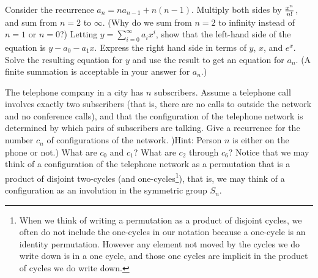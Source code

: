 \bp 
\itemm  Consider the recurrence
$a_n=na_{n-1} +n(n-1)$.  Multiply both sides by $x^n\over n!$, and sum
from $n=2$ to $\infty$.  (Why do we sum from $n=2$ to infinity instead 
of $n=1$ or $n=0$?)  Letting
$y =
\sum_{i=0}^\infty a_ix^i$, show that the left-hand side of the equation
is $y-a_0 -a_1x$.  Express the right hand side in terms of $y$, $x$, and
$e^x$.  Solve the resulting equation for $y$ and use the result to get an
equation for
$a_n$.  (A finite summation is acceptable in your answer for $a_n$.)

\itemesi The telephone company in a city has $n$ subscribers.  Assume a
telephone call involves exactly two subscribers (that is, there are no
calls to outside the network and no conference calls), and that the
configuration of the telephone network is determined by which pairs of
subscribers are talking.  Give a recurrence for the number
$c_n$ of configurations of the network.  )Hint: Person $n$ is either on
the phone or not.)  What are $c_0$ and $c_1$?  What are $c_2$ through
$c_6$?  Notice that we may think of a configuration of the telephone
network as a permutation that is a product of disjoint two-cycles (and
one-cycles\footnote{When we think of writing a
permutation as a product of disjoint cycles, we often do not include the
one-cycles in our notation because a one-cycle is an identity
permutation.  However any element not moved by the cycles we do write
down is in a one cycle, and those one cycles are implicit in the product
of cycles we do write down.}), that is, we may think of a configuration
as an involution in the symmetric group $S_n$.
\label{telephonenetwork}

